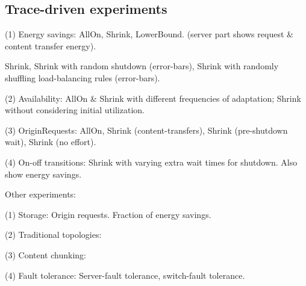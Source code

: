 \subsection{Trace-driven experiments}




(1) Energy savings: AllOn, Shrink, LowerBound. (server part shows request \& content transfer energy).

Shrink, Shrink with random shutdown (error-bars),  Shrink with randomly shuffling load-balancing rules (error-bars).

(2) Availability: AllOn \& Shrink with different frequencies of adaptation; Shrink without considering initial utilization.

(3) OriginRequests: AllOn, Shrink (content-transfers), Shrink (pre-shutdown wait), Shrink (no effort).

(4) On-off transitions: Shrink with varying extra wait times for shutdown. Also show energy savings.


Other experiments:

(1) Storage: Origin requests. Fraction of energy savings.

(2) Traditional topologies: 

(3) Content chunking:  

(4) Fault tolerance: Server-fault tolerance, switch-fault tolerance.

%
%
%
%
